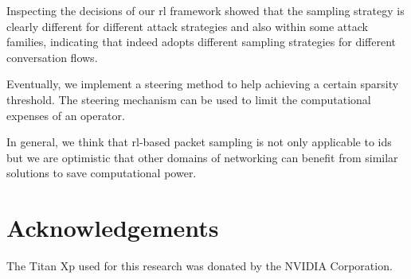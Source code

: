 \documentclass[conference]{IEEEtran}
\begin{document}
Inspecting the decisions of our \gls{rl} framework showed that the sampling strategy is clearly different for different attack strategies and also within some attack families, indicating that \ours{} indeed adopts different sampling strategies for different conversation flows.

Eventually, we implement a steering method to help achieving a certain sparsity threshold. The steering mechanism can be used to limit the computational expenses of an operator.

In general, we think that \gls{rl}-based packet sampling is not only applicable to \gls{ids} but we are optimistic that other domains of networking can benefit from similar solutions to save computational power.

\section*{Acknowledgements}
The Titan Xp used for this research was donated by the NVIDIA Corporation.

\renewcommand*{\bibfont}{\small}


\end{document}
